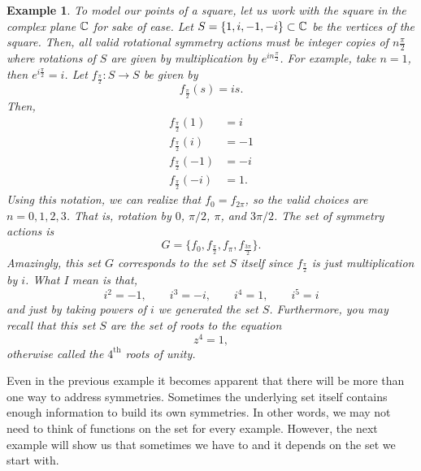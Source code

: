 \documentclass{article}
\theoremstyle{indented}
\newtheorem{example}{Example}
\begin{document}
\begin{example}
\label{ex:square_c}
To model our points of a square, let us work with the square in the complex plane $\mathbb{C}$ for sake of ease. Let $S=\{1,i,-1,-i\}\subset \mathbb{C}$ be the vertices of the square. Then, all valid rotational symmetry actions must be integer copies of $n\frac{\pi}{2}$ where rotations of $S$ are given by multiplication by $e^{in\frac{\pi}{2}}$. For example, take $n=1$, then $e^{i\frac{\pi}{2}}=i$. Let $f_{\frac{\pi}{2}}\colon S \to S$ be given by
\[
f_{\frac{\pi}{2}}(s) = is.
\]
Then,
\begin{align*}
f_{\frac{\pi}{2}}(1) &= i\\
f_{\frac{\pi}{2}}(i) &= -1\\
f_{\frac{\pi}{2}}(-1) &= -i\\
f_{\frac{\pi}{2}}(-i) &= 1.
\end{align*}
Using this notation, we can realize that $f_0=f_{2\pi}$, so the valid choices are $n=0,1,2,3$. That is, rotation by $0$, $\pi/2$, $\pi$, and $3\pi/2$. The set of symmetry actions is
\[
G= \{f_{0},f_{\frac{\pi}{2}}, f_{\pi}, f_{\frac{3\pi}{2}}\}.
\]
Amazingly, this set $G$ corresponds to the set $S$ itself since $f_{\frac{\pi}{2}}$ is just multiplication by $i$. What I mean is that,
\[
i^2=-1,\qquad i^3=-i, \qquad i^4 = 1,\qquad i^5=i
\]
and just by taking powers of $i$ we generated the set $S$. Furthermore, you may recall that this set $S$ are the set of roots to the equation
\[
z^4=1,
\]
otherwise called the $4^\textrm{th}$ roots of unity.
\end{example}

Even in the previous example it becomes apparent that there will be more than one way to address symmetries. Sometimes the underlying set itself contains enough information to build its own symmetries. In other words, we may not need to think of functions on the set for every example. However, the next example will show us that sometimes we have to and it depends on the set we start with.
\end{document}
